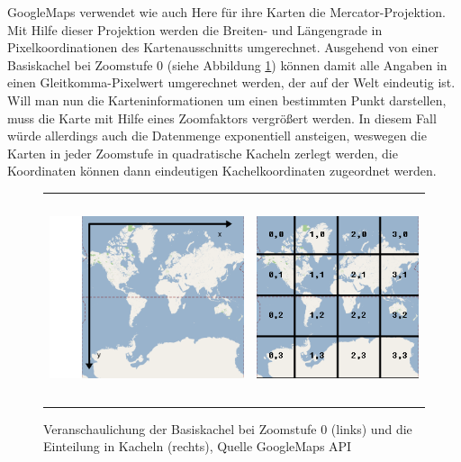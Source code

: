 GoogleMaps verwendet wie auch Here für ihre Karten die Mercator-Projektion. Mit Hilfe dieser Projektion werden die Breiten- und Längengrade in Pixelkoordinationen des Kartenausschnitts umgerechnet. Ausgehend von einer Basiskachel bei Zoomstufe 0 (siehe Abbildung \ref{fig:pixelcoordinates}) können damit alle Angaben in einen Gleitkomma-Pixelwert umgerechnet werden, der auf der Welt eindeutig ist. Will man nun die Karteninformationen um einen bestimmten Punkt darstellen, muss die Karte mit Hilfe eines Zoomfaktors vergrößert werden. In diesem Fall würde allerdings auch die Datenmenge exponentiell ansteigen, weswegen die Karten in jeder Zoomstufe in quadratische Kacheln zerlegt werden, die Koordinaten können dann eindeutigen Kachelkoordinaten zugeordnet werden.\\
\begin{figure}
\centering
\begin{tabular}{@{}cc@{}}
    \includegraphics[height=6cm]{images/pixelCoordinates.png} &
    \includegraphics[height=6cm]{images/tileCoordinates.png} \\
\end{tabular}
\caption{Veranschaulichung der Basiskachel bei Zoomstufe 0 (links) und die Einteilung in Kacheln (rechts), Quelle GoogleMaps API~\cite{googlemaptype}}
\label{fig:pixelcoordinates}
\end{figure}

